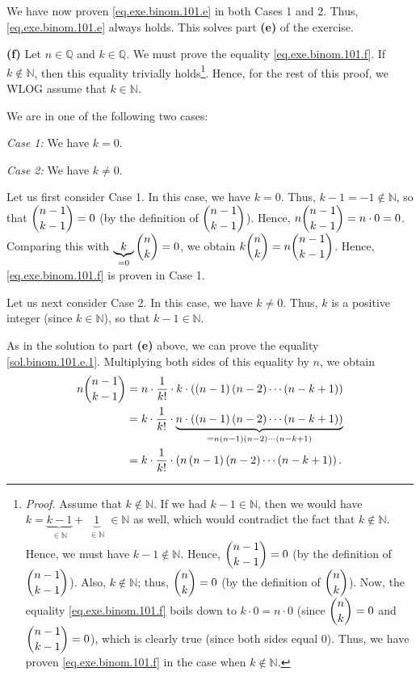 \documentclass[paper=a4, fontsize=12pt]{scrartcl} %
\newcommand{\QQ}{\mathbb{Q}} %
\newcommand{\NN}{\mathbb{N}} %
\newcommand{\tup}[1]{\left( #1 \right)}
\newcommand{\underbrack}[2]{\underbrace{#1}_{\substack{#2}}}
\theoremstyle{plainsl}
\theoremstyle{definition}
\theoremstyle{remark}
\begin{document}
We have now proven \eqref{eq.exe.binom.101.e} in both
Cases 1 and 2. Thus, \eqref{eq.exe.binom.101.e} always holds.
This solves part \textbf{(e)} of the exercise.

\vspace{0.8pc}

\textbf{(f)}
Let $n \in \QQ$ and $k \in \QQ$.
We must prove the equality \eqref{eq.exe.binom.101.f}.
If $k \notin \NN$, then this equality trivially
holds\footnote{\textit{Proof.} Assume that $k \notin \NN$.
If we had $k-1 \in \NN$, then we would have
$k = \underbrack{k-1}{\in \NN} + \underbrack{1}{\in \NN} \in \NN$
as well, which would contradict the fact that $k \notin \NN$.
Hence, we must have $k-1 \notin \NN$.
Hence, $\dbinom{n-1}{k-1} = 0$ (by the definition of
$\dbinom{n-1}{k-1}$).
Also, $k \notin \NN$; thus,
$\dbinom{n}{k} = 0$ (by the definition of $\dbinom{n}{k}$).
Now, the equality \eqref{eq.exe.binom.101.f} boils down to
$k \cdot 0 = n \cdot 0$ (since $\dbinom{n}{k} = 0$ and
$\dbinom{n-1}{k-1} = 0$), which is
clearly true (since both sides equal $0$).
Thus, we have proven \eqref{eq.exe.binom.101.f} in the case
when $k \notin \NN$.}.
Hence, for the rest of this proof, we WLOG assume that $k \in \NN$.

We are in one of the following two cases:

\textit{Case 1:} We have $k = 0$.

\textit{Case 2:} We have $k \neq 0$.

Let us first consider Case 1.
In this case, we have $k = 0$.
Thus, $k-1 = -1 \notin \NN$, so that $\dbinom{n-1}{k-1} = 0$
(by the definition of $\dbinom{n-1}{k-1}$).
Hence, $n \dbinom{n-1}{k-1} = n \cdot 0 = 0$.
Comparing this with $\underbrack{k}{= 0} \dbinom{n}{k} = 0$,
we obtain $k \dbinom{n}{k} = n \dbinom{n-1}{k-1}$.
Hence, \eqref{eq.exe.binom.101.f} is proven in Case 1.

Let us next consider Case 2.
In this case, we have $k \neq 0$.
Thus, $k$ is a positive integer (since $k \in \NN$), so that
$k-1 \in \NN$.

As in the solution to part \textbf{(e)} above, we can prove
the equality \eqref{sol.binom.101.e.1}.
Multiplying both sides of this equality by $n$, we obtain
\begin{align}
n \dbinom{n-1}{k-1}
&= n \cdot \dfrac{1}{k!} \cdot k \cdot \tup{ \tup{n-1} \tup{n-2} \cdots \tup{n-k+1} } \nonumber\\
&= k \cdot \dfrac{1}{k!} \cdot
     \underbrack{n \cdot \tup{ \tup{n-1} \tup{n-2} \cdots \tup{n-k+1} }}
                {= n \tup{n-1} \tup{n-2} \cdots \tup{n-k+1}} \nonumber\\
&= k \cdot \dfrac{1}{k!} \cdot
     \tup{n \tup{n-1} \tup{n-2} \cdots \tup{n-k+1}} .
\label{sol.binom.101.f.1}
\end{align}
\end{document}
